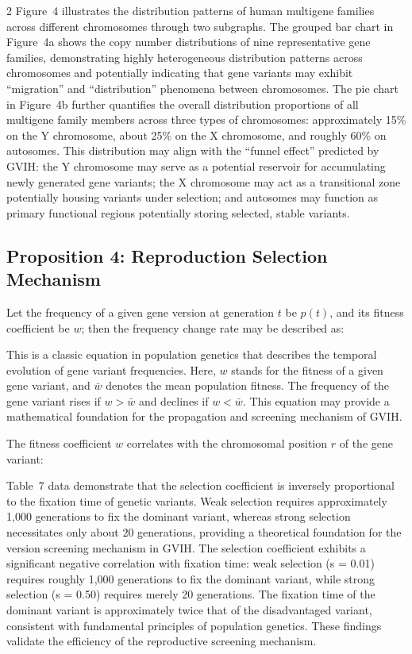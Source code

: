 \documentclass{base}
\begin{document}
\begin{multicols}{2}
Figure~4 illustrates the distribution patterns of human multigene families across different chromosomes through two subgraphs. The grouped bar chart in Figure~4a shows the copy number distributions of nine representative gene families, demonstrating highly heterogeneous distribution patterns across chromosomes and potentially indicating that gene variants may exhibit ``migration'' and ``distribution'' phenomena between chromosomes. The pie chart in Figure~4b further quantifies the overall distribution proportions of all multigene family members across three types of chromosomes: approximately 15\% on the Y chromosome, about 25\% on the X chromosome, and roughly 60\% on autosomes. This distribution may align with the ``funnel effect'' predicted by GVIH: the Y chromosome may serve as a potential reservoir for accumulating newly generated gene variants; the X chromosome may act as a transitional zone potentially housing variants under selection; and autosomes may function as primary functional regions potentially storing selected, stable variants.





\subsection{Proposition 4: Reproduction Selection Mechanism}
Let the frequency of a given gene version at generation $t$ be $p(t)$, and its fitness coefficient be $w$; then the frequency change rate may be described as:




This is a classic equation in population genetics that describes the temporal evolution of gene variant frequencies. Here, $w$ stands for the fitness of a given gene variant, and $\bar{w}$ denotes the mean population fitness. The frequency of the gene variant rises if $w > \bar{w}$ and declines if $w < \bar{w}$. This equation may provide a mathematical foundation for the propagation and screening mechanism of GVIH.

The fitness coefficient $w$ correlates with the chromosomal position $r$ of the gene variant:



Table~7 data demonstrate that the selection coefficient is inversely proportional to the fixation time of genetic variants. Weak selection requires approximately 1,000 generations to fix the dominant variant, whereas strong selection necessitates only about 20 generations, providing a theoretical foundation for the version screening mechanism in GVIH. The selection coefficient exhibits a significant negative correlation with fixation time: weak selection (s = 0.01) requires roughly 1,000 generations to fix the dominant variant, while strong selection (s = 0.50) requires merely 20 generations. The fixation time of the dominant variant is approximately twice that of the disadvantaged variant, consistent with fundamental principles of population genetics. These findings validate the efficiency of the reproductive screening mechanism.


\end{multicols}
\end{document}
